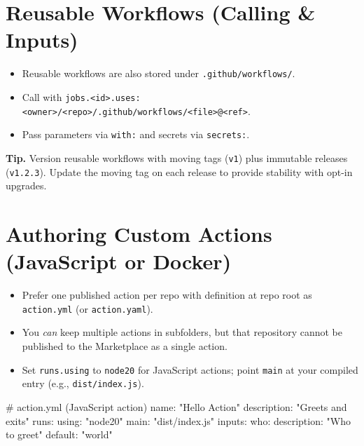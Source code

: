 \documentclass[11pt]{article}
\begin{document}
\section{Reusable Workflows (Calling \& Inputs)}
\begin{itemize}
  \item Reusable workflows are also stored under \texttt{.github/workflows/}.
  \item Call with \texttt{jobs.<id>.uses: <owner>/<repo>/.github/workflows/<file>@<ref>}.
  \item Pass parameters via \texttt{with:} and secrets via \texttt{secrets:}.
\end{itemize}


\begin{tcolorbox}
\textbf{Tip.} Version reusable workflows with moving tags (\texttt{v1}) plus immutable releases (\texttt{v1.2.3}). Update the moving tag on each release to provide stability with opt-in upgrades.
\end{tcolorbox}

\section{Authoring Custom Actions (JavaScript or Docker)}
\begin{itemize}
  \item Prefer one published action per repo with definition at repo root as \texttt{action.yml} (or \texttt{action.yaml}).
  \item You \emph{can} keep multiple actions in subfolders, but that repository cannot be published to the Marketplace as a single action.
  \item Set \texttt{runs.using} to \texttt{node20} for JavaScript actions; point \texttt{main} at your compiled entry (e.g., \texttt{dist/index.js}).
\end{itemize}

\begin{yamlcode}
# action.yml (JavaScript action)
name: "Hello Action"
description: "Greets and exits"
runs:
  using: "node20"
  main: "dist/index.js"
inputs:
  who:
    description: "Who to greet"
    default: "world"
\end{yamlcode}
\end{document}
